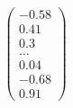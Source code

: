 \documentclass[preview]{standalone}
\begin{document}
\begin{align*}
\begin{pmatrix} -0.58 \\ 0.41 \\ 0.3 \\ \dots \\ 0.04 \\ -0.68 \\ 0.91 \end{pmatrix}
\end{align*}
\end{document}

